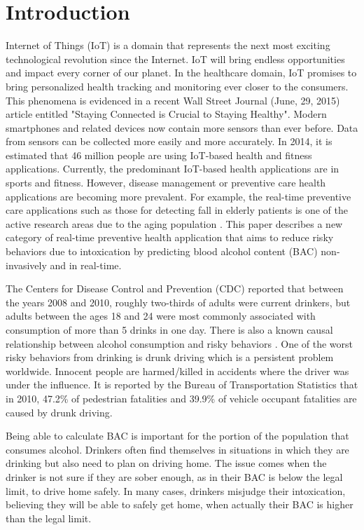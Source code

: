 \section{Introduction}

Internet of Things (IoT) is a domain that represents the next most exciting technological revolution since the Internet. IoT will bring endless opportunities and impact every corner of our planet. In the healthcare domain, IoT promises to bring personalized health tracking and monitoring ever closer to the consumers. This phenomena is evidenced in a recent Wall Street Journal (June, 29, 2015) article entitled "Staying Connected is Crucial to Staying Healthy". Modern smartphones and related devices now contain more sensors than ever before. Data from sensors can be collected more easily and more accurately. In 2014, it is estimated that 46 million people are using IoT-based health and fitness applications. Currently, the predominant IoT-based health applications are in sports and fitness. However, disease management or preventive care health applications are becoming more prevalent. For example, the real-time preventive care applications such as those for detecting fall in elderly patients is one of the active research areas due to the aging population \cite{Tacconi:2011}. This paper describes a new category of real-time preventive health application that aims to reduce risky behaviors due to intoxication by predicting blood alcohol content (BAC) non-invasively and in real-time.

The Centers for Disease Control and Prevention (CDC) reported \cite{Schoenborn:2013} that between the years 2008 and 2010, roughly two-thirds of adults were current drinkers, but adults between the ages 18 and 24 were most commonly associated with consumption of more than 5 drinks in one day. There is also a known causal relationship between alcohol consumption and risky behaviors \cite{Assaad:2006}. One of the worst risky behaviors from drinking is drunk driving which is a persistent problem worldwide. Innocent people are harmed/killed in accidents where the driver was under the influence. It is reported by the Bureau of Transportation Statistics \cite{Chambers:2012} that in 2010, 47.2\% of pedestrian fatalities and 39.9\% of vehicle occupant fatalities are caused by drunk driving.

Being able to calculate BAC is important for the portion of the population that consumes alcohol. Drinkers often find themselves in situations in which they are drinking but also need to plan on driving home. The issue comes when the drinker is not sure if they are sober enough, as in their BAC is below the legal limit, to drive home safely. In many cases, drinkers misjudge their intoxication, believing they will be able to safely get home, when actually their BAC is higher than the legal limit. 

